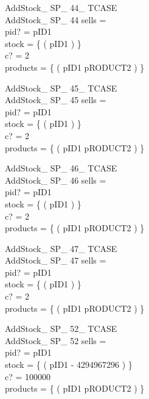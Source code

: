 \begin{schema}{AddStock\_ SP\_ 44\_ TCASE}\\
AddStock\_ SP\_ 44
\where
sells =~\emptyset \\
pid? = pID1 \\
stock = \{ ( pID1  ) \} \\
c? = 2 \\
products = \{ ( pID1 \mapsto pRODUCT2 ) \}
\end{schema}


\begin{schema}{AddStock\_ SP\_ 45\_ TCASE}\\
AddStock\_ SP\_ 45
\where
sells =~\emptyset \\
pid? = pID1 \\
stock = \{ ( pID1  ) \} \\
c? = 2 \\
products = \{ ( pID1 \mapsto pRODUCT2 ) \}
\end{schema}


\begin{schema}{AddStock\_ SP\_ 46\_ TCASE}\\
AddStock\_ SP\_ 46
\where
sells =~\emptyset \\
pid? = pID1 \\
stock = \{ ( pID1  ) \} \\
c? = 2 \\
products = \{ ( pID1 \mapsto pRODUCT2 ) \}
\end{schema}


\begin{schema}{AddStock\_ SP\_ 47\_ TCASE}\\
AddStock\_ SP\_ 47
\where
sells =~\emptyset \\
pid? = pID1 \\
stock = \{ ( pID1  ) \} \\
c? = 2 \\
products = \{ ( pID1 \mapsto pRODUCT2 ) \}
\end{schema}


\begin{schema}{AddStock\_ SP\_ 52\_ TCASE}\\
AddStock\_ SP\_ 52
\where
sells =~\emptyset \\
pid? = pID1 \\
stock = \{ ( pID1 \mapsto - 4294967296 ) \} \\
c? = 100000 \\
products = \{ ( pID1 \mapsto pRODUCT2 ) \}
\end{schema}


